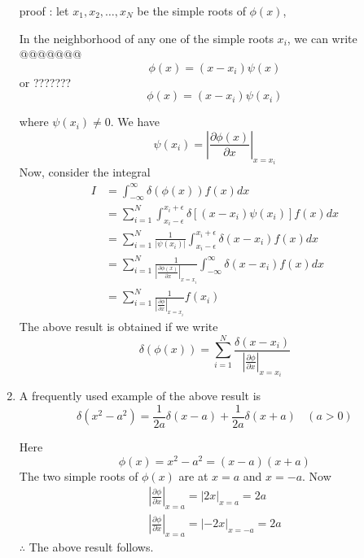 \begin{enumerate}[label=\textbf{Property \ \arabic*},start=1]
			proof : let $x_1 , x_2, \ldots , x_N$ be the simple roots of $\phi(x)$,
			
			
			In the neighborhood of any one of the simple roots $x_i$, we can write
			@@@@@@@
			\begin{equation}
				\phi(x) = (x - x_i) \psi(x)
			\end{equation}
			or ???????
			\begin{equation}
				\phi(x) = (x - x_i) \psi(x_i)
			\end{equation}
			
			where $\psi(x_i) \neq 0$. We have
			\begin{equation}
				\psi(x_i) = \left|\frac{\partial \phi(x)}{\partial x} \right|_{x=x_i}
			\end{equation}
			Now, consider the integral
			\begin{eqnarray}
				I &= \int_{-\infty}^{\infty} \delta(\phi(x)) f(x) dx  \nonumber \\
				&= \sum_{i=1}^{N} \int_{x_i - \epsilon}^{x_i + \epsilon} \delta[(x-x_i) \psi(x_i)] f(x) dx \nonumber \\
				&= \sum_{i=1}^{N} \frac{1}{|\psi(x_i)|}\int_{x_i - \epsilon}^{x_i + \epsilon} \delta(x-x_i) f(x) dx \nonumber \\
				&= \sum_{i=1}^{N} \frac{1}{ \left|\frac{\partial \phi(x)}{\partial x} \right|_{x=x_i}}\int_{-\infty}^{\infty} \delta(x-x_i) f(x) dx \nonumber \\
				&= \sum_{i=1}^{N} \frac{1}{ \left|\frac{\partial \phi}{\partial x} \right|_{x=x_i}} f(x_i) \nonumber
			\end{eqnarray}
			The above result is obtained if we write
			\begin{equation}
				\delta(\phi(x)) = \sum_{i=1}^{N} \frac{\delta(x - x_i)}{\left|\frac{\partial \phi}{\partial x}\right|_{x=x_i}}
			\end{equation}
			
			
			\item
			A frequently used example of the above result is
			\begin{equation}
				\delta(x^2 - a^2) = \frac{1}{2 a} \delta(x - a) + \frac{1}{2 a} \delta(x + a) \ \ \ \ (a > 0)
			\end{equation}
			
			Here
			\begin{equation}
				\phi(x) = x^2 - a^2 = (x-a)(x+a)
			\end{equation}
				The two simple roots of $\phi(x)$ are at $x=a $ and $x=-a$. Now
				\begin{eqnarray}
					\left|\frac{\partial \phi}{\partial x}\right|_{x=a} = \left|2 x\right|_{x=a} = 2a  \\
					\left|\frac{\partial \phi}{\partial x}\right|_{x=a} = \left|-2 x\right|_{x=-a} = 2a 
				\end{eqnarray}
				$\therefore$ The above result follows.
				

\end{enumerate}
